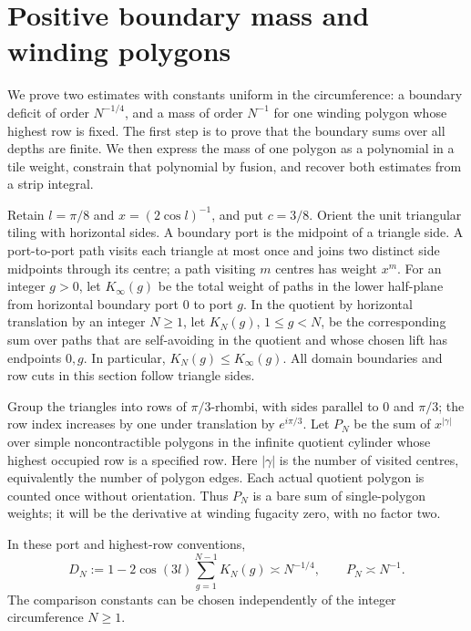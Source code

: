 \section{Positive boundary mass and winding polygons}\label{sec:cylinder}

We prove two estimates with constants uniform in the circumference: a
boundary deficit of order \(N^{-1/4}\), and a mass of order \(N^{-1}\)
for one winding polygon whose highest row is fixed.  The first step is
to prove that the boundary sums over all depths are finite.  We then
express the mass of one polygon as a polynomial in a tile weight, constrain that
polynomial by fusion, and recover both estimates from a strip integral.

Retain \(l=\pi/8\) and \(x=(2\cos l)^{-1}\), and put \(c=3/8\).
Orient the unit triangular tiling with horizontal sides.  A boundary
port is the midpoint of a triangle side.  A port-to-port path visits
each triangle at most once and joins two distinct side midpoints through
its centre; a path visiting \(m\) centres has weight \(x^m\).
For an integer \(g>0\), let \(K_\infty(g)\) be the total weight of
paths in the lower half-plane from horizontal boundary port \(0\) to
port \(g\).  In the quotient by horizontal translation by an integer
\(N\ge1\), let \(K_N(g)\), \(1\le g<N\), be the corresponding sum over
paths that are self-avoiding in the quotient and whose chosen lift has
endpoints \(0,g\).  In particular, \(K_N(g)\le K_\infty(g)\).
All domain boundaries and row cuts in this section follow triangle
sides.

Group the triangles into rows of \(\pi/3\)-rhombi, with sides parallel
to \(0\) and \(\pi/3\); the row index increases by one under translation
by \(e^{i\pi/3}\).  Let \(P_N\) be the sum of \(x^{|\gamma|}\) over
simple noncontractible polygons in the infinite quotient cylinder
whose highest occupied row is a specified row.  Here \(|\gamma|\) is
the number of visited centres, equivalently the number of polygon
edges.  Each actual quotient polygon is counted once without
orientation.  Thus \(P_N\) is a bare sum of single-polygon weights; it
will be the derivative at winding fugacity zero, with no factor two.

\begin{proposition}\label{prop:cylinder}
In these port and highest-row conventions,
\[
 D_N:=1-2\cos(3l)\sum_{g=1}^{N-1}K_N(g)\asymp N^{-1/4},
 \qquad
 P_N\asymp N^{-1}.
\]
The comparison constants can be chosen independently of the integer
circumference \(N\ge1\).
\end{proposition}

